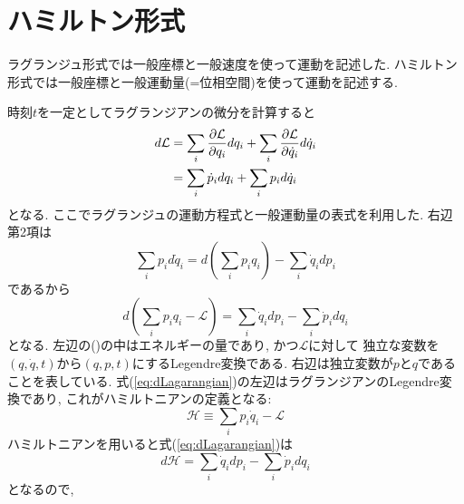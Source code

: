 \section{ハミルトン形式}
ラグランジュ形式では一般座標と一般速度を使って運動を記述した.
ハミルトン形式では一般座標と一般運動量(=位相空間)を使って運動を記述する.

時刻$t$を一定としてラグランジアンの微分を計算すると
\begin{align}
  d \mathcal{L}
&=\sum_{i} \frac{\partial \mathcal{L}}{\partial q_{i}} dq_{i}
 +\sum_{i} \frac{\partial \mathcal{L}}{\partial \dot{q}_{i}} d \dot{q}_{i}
  \notag
  \\
&=\sum_{i} \dot{p}_{i} dq_{i} + \sum_{i} p_{i} d \dot{q}_{i}
\end{align}
となる.
ここでラグランジュの運動方程式と一般運動量の表式を利用した.
右辺第2項は
\begin{equation}
 \sum_{i} p_{i} d \dot{q}_{i}
 = d \left(\sum_{i} p_{i} q_{i}\right) - \sum_{i} \dot{q}_{i} dp_{i}
\end{equation}
であるから
\begin{equation}
 d \left(\sum_{i} p_{i} q_{i} - \mathcal{L}\right)
=\sum_{i} \dot{q}_{i} d p_{i} - \sum_{i} \dot{p}_{i} d q_{i}
 \label{eq:dLagarangian}
\end{equation}
となる.
左辺の()の中はエネルギーの量であり, かつ$\mathcal{L}$に対して
独立な変数を$(q, \dot{q}, t)$から$(q, p, t)$にするLegendre変換である.
右辺は独立変数が$p$と$q$であることを表している.
式(\ref{eq:dLagarangian})の左辺はラグランジアンのLegendre変換であり,
これがハミルトニアンの定義となる:
\begin{equation}
 \mathcal{H} \equiv \sum_{i} p_{i} \dot{q}_{i} - \mathcal{L}
\end{equation}
ハミルトニアンを用いると式(\ref{eq:dLagarangian})は
\begin{equation}
 d \mathcal{H}
=\sum_{i} \dot{q}_{i} d p_{i} - \sum_{i} \dot{p}_{i} d q_{i}
\end{equation}
となるので,


